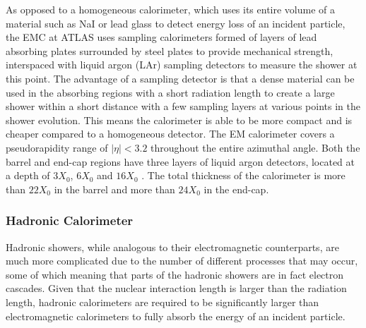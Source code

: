 \documentclass{article}
\begin{document}
As opposed to a homogeneous calorimeter, which uses its entire volume of a material such as NaI or lead glass to detect energy loss of an incident particle, the EMC at ATLAS uses sampling calorimeters formed of layers of lead absorbing plates surrounded by steel plates to provide mechanical strength, interspaced with liquid argon (LAr) sampling detectors to measure the shower at this point. The advantage of a sampling detector is that a dense material can be used in the absorbing regions with a short radiation length to create a large shower within a short distance with a few sampling layers at various points in the shower evolution. This means the calorimeter is able to be more compact and is cheaper compared to a homogeneous detector. 
The EM calorimeter covers a pseudorapidity range of $|\eta|<3.2$ throughout the entire azimuthal angle. Both the barrel and end-cap regions have three layers of liquid argon detectors, located at a depth of $3X_0$, $6X_0$ and $16X_0$ \cite{ATLASCalorimetry}. The total thickness of the calorimeter is more than $22X_0$ in the barrel and more than $24X_0$ in the end-cap.

\subsubsection{Hadronic Calorimeter}
\label{sec:ATLAS_DetectorSchematics_HCAL}

Hadronic showers, while analogous to their electromagnetic counterparts, are much more complicated due to the number of different processes that may occur, some of which meaning that parts of the hadronic showers are in fact electron cascades. Given that the nuclear interaction length is larger than the radiation length, hadronic calorimeters are required to be significantly larger than electromagnetic calorimeters to fully absorb the energy of an incident particle.
\end{document}
